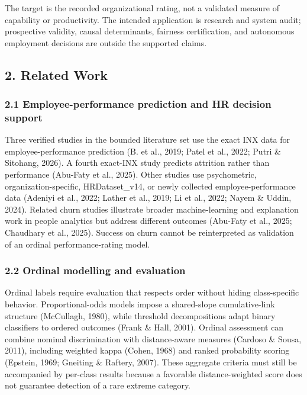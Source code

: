 \documentclass[
  a4paper,
  review]{elsarticle}
\begin{document}
The target is the recorded organizational rating, not a validated
measure of capability or productivity. The intended application is
research and system audit; prospective validity, causal determinants,
fairness certification, and autonomous employment decisions are outside
the supported claims.

\subsection{2. Related Work}\label{related-work}

\subsubsection{2.1 Employee-performance prediction and HR decision
support}\label{employee-performance-prediction-and-hr-decision-support}

Three verified studies in the bounded literature set use the exact INX
data for employee-performance prediction (B. et al., 2019; Patel et al.,
2022; Putri \& Sitohang, 2026). A fourth exact-INX study predicts
attrition rather than performance (Abu-Faty et al., 2025). Other studies
use psychometric, organization-specific, HRDataset\_v14, or newly
collected employee-performance data (Adeniyi et al., 2022; Lather et
al., 2019; Li et al., 2022; Nayem \& Uddin, 2024). Related churn studies
illustrate broader machine-learning and explanation work in people
analytics but address different outcomes (Abu-Faty et al., 2025;
Chaudhary et al., 2025). Success on churn cannot be reinterpreted as
validation of an ordinal performance-rating model.

\subsubsection{2.2 Ordinal modelling and
evaluation}\label{ordinal-modelling-and-evaluation}

Ordinal labels require evaluation that respects order without hiding
class-specific behavior. Proportional-odds models impose a shared-slope
cumulative-link structure (McCullagh, 1980), while threshold
decompositions adapt binary classifiers to ordered outcomes (Frank \&
Hall, 2001). Ordinal assessment can combine nominal discrimination with
distance-aware measures (Cardoso \& Sousa, 2011), including weighted
kappa (Cohen, 1968) and ranked probability scoring (Epstein, 1969;
Gneiting \& Raftery, 2007). These aggregate criteria must still be
accompanied by per-class results because a favorable distance-weighted
score does not guarantee detection of a rare extreme category.
\end{document}
